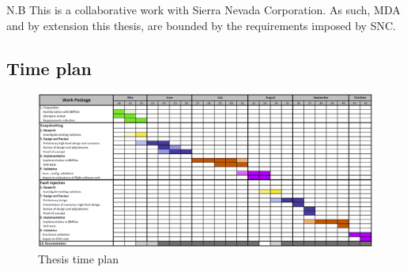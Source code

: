 \documentclass[12pt,english]{rftthesis}
\begin{document}
\vspace{1.5cm}
N.B This is a collaborative work with Sierra Nevada Corporation. As such, MDA and by extension this thesis, are bounded by the requirements imposed by SNC.

\newpage

\begin{landscape}
\section*{Time plan}
\begin{figure}[H]
	\includegraphics[scale=0.47]{art/time_plan.png}
	\caption{Thesis time plan}
\end{figure}
\end{landscape}
\end{document}
